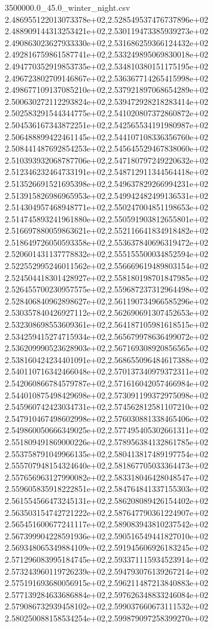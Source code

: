\begin{filecontents*}{3500000.0_45.0_winter_night.csv}
2.486955122013073378e+02,2.528549537476737896e+02
2.488909144313253421e+02,2.530119473385939273e+02
2.490863023627933330e+02,2.531686259366124432e+02
2.492816759861587741e+02,2.533249895069830018e+02
2.494770352919853735e+02,2.534810380151175195e+02
2.496723802709146867e+02,2.536367714265415998e+02
2.498677109137085210e+02,2.537921897068654289e+02
2.500630272112293824e+02,2.539472928218283414e+02
2.502583291544344775e+02,2.541020807372860872e+02
2.504536167343872251e+02,2.542565534191980987e+02
2.506488899422461145e+02,2.544107108336356760e+02
2.508441487692854253e+02,2.545645529467838060e+02
2.510393932068787706e+02,2.547180797249220632e+02
2.512346232464733191e+02,2.548712911344564418e+02
2.513526691521695398e+02,2.549637829266994231e+02
2.513915826986965953e+02,2.549942482499136531e+02
2.514304957468948771e+02,2.550247004851198653e+02
2.514745893241961880e+02,2.550591903812655801e+02
2.516697880059863621e+02,2.552116641834918482e+02
2.518649726050593358e+02,2.553637840696319472e+02
2.520601431137778832e+02,2.555155500034852594e+02
2.522552995246011562e+02,2.556669619489803154e+02
2.524504418301428927e+02,2.558180198701847985e+02
2.526455700230957575e+02,2.559687237312964498e+02
2.528406840962898627e+02,2.561190734966585296e+02
2.530357840426927112e+02,2.562690691307452653e+02
2.532308698553609361e+02,2.564187105981618515e+02
2.534259415274715934e+02,2.565679978636499072e+02
2.536209990523628903e+02,2.567169308920856565e+02
2.538160424234401091e+02,2.568655096484617388e+02
2.540110716342466048e+02,2.570137340979372311e+02
2.542060866784579787e+02,2.571616042057466984e+02
2.544010875498429698e+02,2.573091199372975098e+02
2.545960742423034731e+02,2.574562812581107210e+02
2.547910467498602998e+02,2.576030881338465406e+02
2.549860050666349025e+02,2.577495405302661311e+02
2.551809491869000226e+02,2.578956384132861785e+02
2.553758791049966135e+02,2.580413817489197754e+02
2.555707948154324640e+02,2.581867705033364473e+02
2.557656963127990082e+02,2.583318046428048547e+02
2.559605835918222851e+02,2.584764841337155303e+02
2.561554566473245131e+02,2.586208089426154402e+02
2.563503154742721222e+02,2.587647790361224907e+02
2.565451600677241117e+02,2.589083943810237542e+02
2.567399904228591936e+02,2.590516549441827010e+02
2.569348065349884109e+02,2.591945606926183245e+02
2.571296083995184745e+02,2.593371115934523914e+02
2.573243960119726239e+02,2.594793076139267214e+02
2.575191693680056915e+02,2.596211487213840883e+02
2.577139284633686884e+02,2.597626348833246084e+02
2.579086732939458102e+02,2.599037660673111532e+02
2.580250088158534254e+02,2.599879097258399270e+02

\end{filecontents*}

